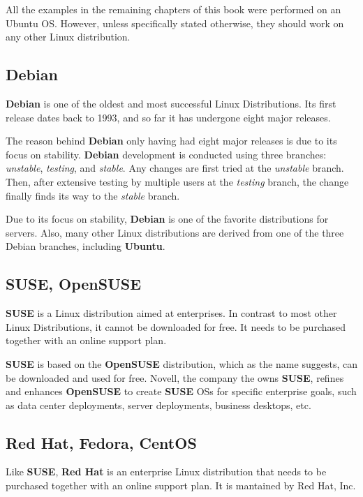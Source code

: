 All the examples in the remaining chapters of this book were performed on an Ubuntu \acs{OS}. However, unless specifically stated otherwise, they should work on any other Linux distribution.


\subsection{Debian}
\textbf{Debian} is one of the oldest and most successful Linux Distributions. Its first release dates back to 1993, and so far it has undergone eight major releases.

The reason behind \textbf{Debian} only having had eight major releases is due to its focus on stability. \textbf{Debian} development is conducted using three branches: \textit{unstable}, \textit{testing}, and \textit{stable}. Any changes are first tried at the \textit{unstable} branch. Then, after extensive testing by multiple users at the \textit{testing} branch, the change finally finds its way to the \textit{stable} branch.

Due to its focus on stability, \textbf{Debian} is one of the favorite distributions for servers. Also, many other Linux distributions are derived from one of the three Debian branches, including \textbf{Ubuntu}.

\subsection{SUSE, OpenSUSE}
\textbf{SUSE} is a Linux distribution aimed at enterprises. In contrast to most other Linux Distributions, it cannot be downloaded for free. It needs to be purchased together with an online support plan.

\textbf{SUSE} is based on the \textbf{OpenSUSE} distribution, which as the name suggests, can be downloaded and used for free. Novell, the company the owns \textbf{SUSE}, refines and enhances \textbf{OpenSUSE} to create \textbf{SUSE} \acs{OS}s for specific enterprise goals, such as data center deployments, server deployments, business desktops, etc.

\subsection{Red Hat, Fedora, CentOS}
Like \textbf{SUSE}, \textbf{Red Hat} is an enterprise Linux distribution that needs to be purchased together with an online support plan. It is mantained by Red Hat, Inc.

